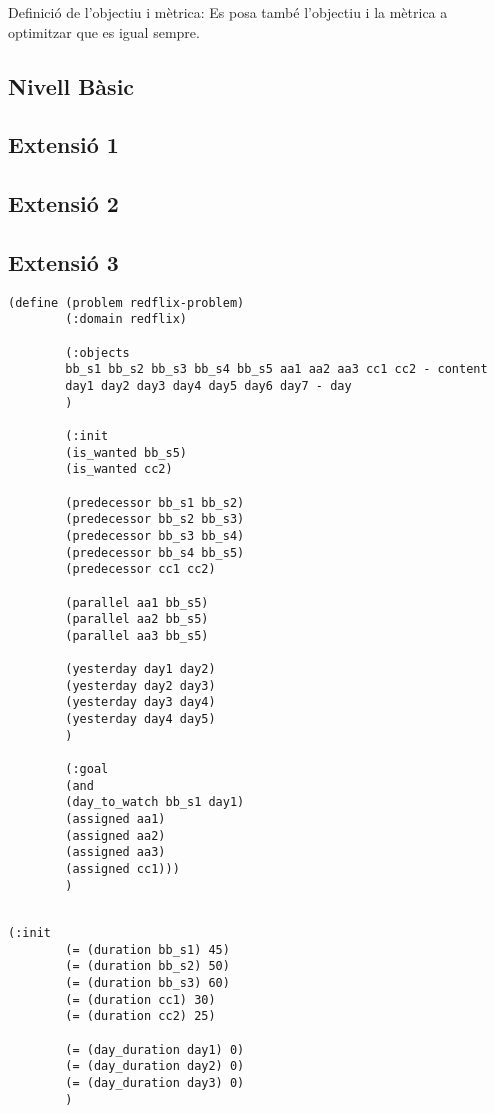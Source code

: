 \documentclass[a4paper]{article}
\begin{document}
	Definició de l'objectiu i mètrica:
	Es posa també l'objectiu i la mètrica a optimitzar que es igual sempre.
	
	
	\subsection{Nivell Bàsic}
	
	\subsection{Extensió 1}
	
	\subsection{Extensió 2}
	
	\subsection{Extensió 3}
		\begin{lstlisting}[language=PDDL, caption={Novetats en la inicialització per l'extensió 4}, label={lst:iniExtensio4}]
		(define (problem redflix-problem)
		(:domain redflix)
		
		(:objects
		bb_s1 bb_s2 bb_s3 bb_s4 bb_s5 aa1 aa2 aa3 cc1 cc2 - content
		day1 day2 day3 day4 day5 day6 day7 - day
		)
		
		(:init
		(is_wanted bb_s5)
		(is_wanted cc2)
		
		(predecessor bb_s1 bb_s2)
		(predecessor bb_s2 bb_s3)
		(predecessor bb_s3 bb_s4)
		(predecessor bb_s4 bb_s5)
		(predecessor cc1 cc2)
		
		(parallel aa1 bb_s5)
		(parallel aa2 bb_s5)
		(parallel aa3 bb_s5)
		
		(yesterday day1 day2)
		(yesterday day2 day3)
		(yesterday day3 day4)
		(yesterday day4 day5)
		)
		
		(:goal
		(and
		(day_to_watch bb_s1 day1)
		(assigned aa1)
		(assigned aa2)
		(assigned aa3)
		(assigned cc1)))
		)
		
	\end{lstlisting}
	
	\begin{lstlisting}[language=PDDL, caption={Novetats en la inicialització per l'extensió 4}, label={lst:iniExtensio4}]
		(:init
		(= (duration bb_s1) 45)
		(= (duration bb_s2) 50)
		(= (duration bb_s3) 60)
		(= (duration cc1) 30)
		(= (duration cc2) 25)
		
		(= (day_duration day1) 0)
		(= (day_duration day2) 0)
		(= (day_duration day3) 0)
		)
	\end{lstlisting}
	
\end{document}
